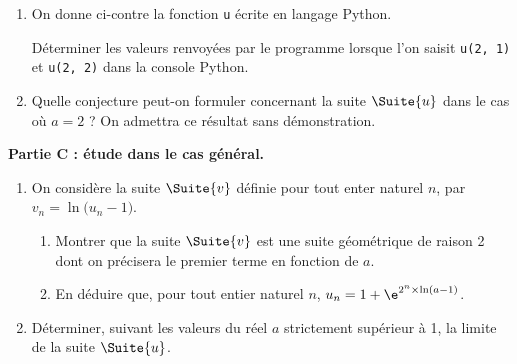 \begin{enumerate}
	\item On donne ci-contre la fonction \texttt{u} écrite en langage \textsf{Python}.
	
	Déterminer les valeurs renvoyées par le programme lorsque l'on saisit \texttt{u(2, 1)} et \texttt{u(2, 2)} dans la console \textsf{Python}.
	\item Quelle conjecture peut-on formuler concernant la suite $\Suite{u}$ dans le cas où $a = 2$ ? On admettra ce résultat sans démonstration. 
\end{enumerate}

\begin{Centrage}
	\textbf{Partie C : étude dans le cas général.}
\end{Centrage}

\begin{enumerate}
	\item On considère la suite $\Suite{v}$ définie pour tout enter naturel $n$, par $v_n = \ln\big(u_n-1\big)$.
	\begin{enumerate}
		\item Montrer que la suite $\Suite{v}$ est une suite géométrique de raison 2 dont on précisera le premier terme en fonction de $a$.
		\item En déduire que, pour tout entier naturel $n$, $u_n = 1+\e^{2^n \times \ln(a-1)}$.
	\end{enumerate}
	\item Déterminer, suivant les valeurs du réel $a$ strictement supérieur à 1, la limite de la suite $\Suite{u}$.
\end{enumerate}